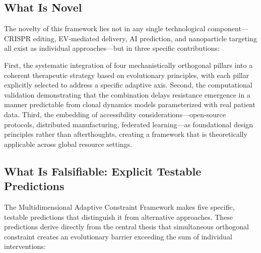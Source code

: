 \documentclass[12pt,a4paper]{article}
\begin{document}
\subsection{What Is Novel}

The novelty of this framework lies not in any single technological component—CRISPR editing, EV-mediated delivery, AI prediction, and nanoparticle targeting all exist as individual approaches—but in three specific contributions:

First, the systematic integration of four mechanistically orthogonal pillars into a coherent therapeutic strategy based on evolutionary principles, with each pillar explicitly selected to address a specific adaptive axis. Second, the computational validation demonstrating that the combination delays resistance emergence in a manner predictable from clonal dynamics models parameterized with real patient data. Third, the embedding of accessibility considerations—open-source protocols, distributed manufacturing, federated learning—as foundational design principles rather than afterthoughts, creating a framework that is theoretically applicable across global resource settings.

\subsection{What Is Falsifiable: Explicit Testable Predictions}

The Multidimensional Adaptive Constraint Framework makes five specific, testable predictions that distinguish it from alternative approaches. These predictions derive directly from the central thesis that simultaneous orthogonal constraint creates an evolutionary barrier exceeding the sum of individual interventions:
\end{document}
